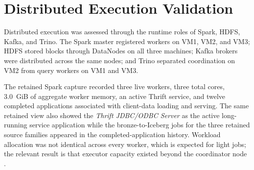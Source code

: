 \section{Distributed Execution Validation}
Distributed execution was assessed through the runtime roles of Spark, HDFS, Kafka, and Trino. The Spark master registered workers on VM1, VM2, and VM3; HDFS stored blocks through DataNodes on all three machines; Kafka brokers were distributed across the same nodes; and Trino separated coordination on VM2 from query workers on VM1 and VM3.

The retained Spark capture recorded three live workers, three total cores, 3.0~GiB of aggregate worker memory, an active Thrift service, and twelve completed applications associated with client-data loading and serving. The same retained view also showed the \textit{Thrift JDBC/ODBC Server} as the active long-running service application while the bronze-to-Iceberg jobs for the three retained source families appeared in the completed-application history. Workload allocation was not identical across every worker, which is expected for light jobs; the relevant result is that executor capacity existed beyond the coordinator node \cite{apache_spark_docs}.

